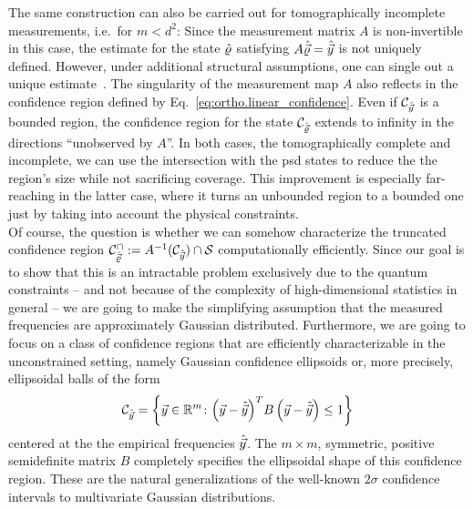 The same construction can also be carried out for tomographically incomplete measurements, i.e.\ for $m<d^{2}$:
Since the measurement matrix $A$ is non-invertible in this case, the estimate for the state $\hat{\varrho}$ satisfying $A\hat{\vec\varrho} = \hat{\vec y}$ is not uniquely defined.
However, under additional structural assumptions, one can single out a unique estimate~\cite{Gross_2010_Quantum,Flammia_2012_Quantum}.
The singularity of the measurement map $A$ also reflects in the confidence region defined by Eq.~\eqref{eq:ortho.linear_confidence}.
Even if $\mathcal{C}_{\hat{\vec y}}$ is a bounded region, the confidence region for the state $\mathcal{C}_{\hat{\vec \varrho}}$ extends to infinity in the directions ``unobserved by $A$''.
In both cases, the tomographically complete and incomplete, we can use the intersection with the psd states to reduce the the region's size while not sacrificing coverage.
This improvement is especially far-reaching in the latter case, where it turns an unbounded region to a bounded one just by taking into account the physical constraints.\\


Of course, the question is whether we can somehow characterize the truncated confidence region $\mathcal{C}_{\hat{\vec \varrho}}^\cap := A^{-1}(\mathcal{C}_{\hat{\vec y}}) \cap \mathcal{S}$ computationally efficiently.
Since our goal is to show that this is an intractable problem exclusively due to the quantum constraints -- and not because of the complexity of high-dimensional statistics in general -- we are going to make the simplifying assumption that the measured frequencies are approximately Gaussian distributed.
Furthermore, we are going to focus on a class of confidence regions that are efficiently characterizable in the unconstrained setting, namely Gaussian confidence ellipsoids or, more precisely, ellipsoidal balls of the form
\begin{equation}
  \mathcal{C}_{\hat{\vec y}} = \left\{ \vec y \in \mathbb{R}^m\colon  {\left(\vec{y}-\hat{\vec{y}}\right)}^T B\left(\vec{y}-\hat{\vec{y}}\right) \leq 1  \right\}
  \label{eq:ortho.confelip}
\end{equation}
centered at the the empirical frequencies  $\hat{\vec y}$.
The $m\times m$, symmetric, positive semidefinite matrix $B$ completely specifies the ellipsoidal shape of this confidence region.
These are the natural generalizations of the well-known $2\sigma$ confidence intervals to multivariate Gaussian distributions.

